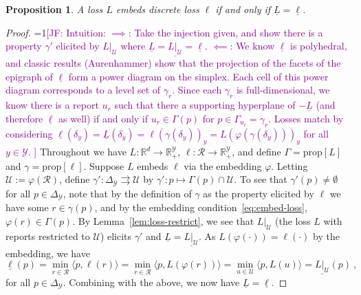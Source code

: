\documentclass[12pt]{article}
\newcommand{\Comments}{1}
\newcommand{\mynote}[2]{\ifnum\Comments=1\textcolor{#1}{#2}\fi}
\newcommand{\jessie}[1]{\mynote{purple}{[JF: #1]}}
\newcommand{\reals}{\mathbb{R}}
\newcommand{\prop}[1]{\mathrm{prop}[#1]}
\newcommand{\simplex}{\Delta_\Y}
\newcommand{\R}{\mathcal{R}}
\newcommand{\U}{\mathcal{U}}
\newcommand{\Y}{\mathcal{Y}}
\newcommand{\risk}[1]{\underline{#1}}
\newcommand{\inprod}[2]{\langle #1, #2 \rangle}%
\newcommand{\toto}{\rightrightarrows}
\newtheorem{proposition}{Proposition}
\begin{document}
\begin{proposition}\label{prop:embed-bayes-risks}
  A loss $L$ embeds discrete loss $\ell$ if and only if $\risk{L}=\risk{\ell}$.
\end{proposition}
\begin{proof}
	\jessie{Intuition: $\implies$: Take the injection given, and show there is a property $\gamma'$ elicited by $L|_\U$ where $\risk{L} = \risk{L|_\U} = \risk{\ell}$.
	$\impliedby$: We know $\risk{\ell}$ is polyhedral, and classic results (Aurenhammer) show that the projection of the facets of the epigraph of $\risk{\ell}$ form a power diagram on the simplex.  Each cell of this power diagram corresponds to a level set of $\gamma_r$. Since each $\gamma_r$ is full-dimensional, we know there is a report $u_r$ such that there a supporting hyperplane of $-\risk{L}$ (and therefore $\risk{\ell}$ as well) if and only if $u_r \in \Gamma(p)$ for $p \in \Gamma_{u_r} = \gamma_r$.  Losses match by considering $\risk{\ell}(\delta_y) = \risk{L}(\delta_y) = \ell(\gamma(\delta_y))_y = L(\varphi(\gamma(\delta_y)))_y$ for all $y \in \Y$. }
  Throughout we have $L:\reals^d\to\reals^\Y_+$, $\ell:\R\to\reals^\Y_+$, and define $\Gamma = \prop{L}$ and $\gamma = \prop{\ell}$.
  Suppose $L$ embeds $\ell$ via the embedding $\varphi$.
  Letting $\U := \varphi(\R)$, define $\gamma':\simplex \toto \U$ by $\gamma' : p \mapsto \Gamma(p)\cap \U$.
  To see that $\gamma'(p) \neq \emptyset$ for all $p\in\simplex$, note that by the definition of $\gamma$ as the property elicited by $\ell$ we have some $r \in \gamma(p)$, and by the embedding condition~\eqref{eq:embed-loss}, $\varphi(r) \in \Gamma(p)$.
  By Lemma~\ref{lem:loss-restrict}, we see that $L|_{\U}$ (the loss $L$ with reports restricted to $\U$) elicits $\gamma'$ and $\risk{L} = \risk{L|_{\U}}$.
  As $L(\varphi(\cdot)) = \ell(\cdot)$ by the embedding, we have
  \begin{equation*}
    \risk{\ell}(p) = \min_{r \in \R}\inprod{p}{\ell(r)} = \min_{r \in \R}\inprod{p}{L(\varphi(r))} = \min_{u \in \U}\inprod{p}{L(u)} = \risk{L|_\U}(p)~,
  \end{equation*}
  for all $p\in\simplex$.
  Combining with the above, we now have $\risk{L} = \risk{\ell}$.


\end{proof}
\end{document}
